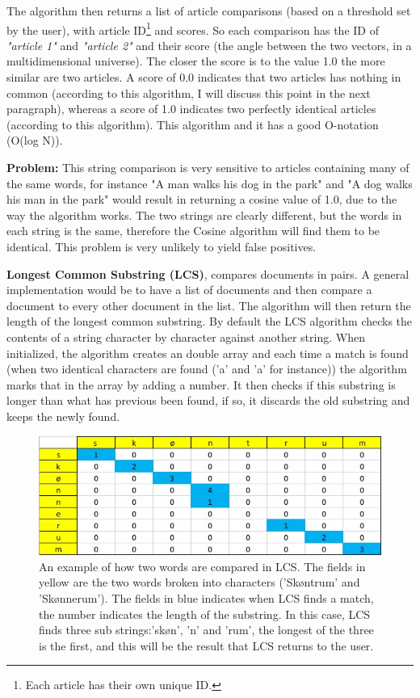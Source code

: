 The algorithm then returns a list of article comparisons (based on a threshold set by the user), with article ID\footnote{Each article has their own unique ID.} and scores. So each comparison has the ID of \textit{"article 1"} and \textit{"article 2"} and their score (the angle between the two vectors, in a multidimensional universe). The closer the score is to the value 1.0 the more similar are two articles. A score of 0.0 indicates that two articles has nothing in common (according to this algorithm, I will discuss this point in the next paragraph), whereas a score of 1.0 indicates two perfectly identical articles (according to this algorithm). This algorithm and it has a good O-notation (O(log N)).

\textbf{Problem:} \label{CosineProblem} This string comparison is very sensitive to articles containing many of the same words, for instance "A man walks his dog in the park" and "A dog walks his man in the park" would result in returning a cosine value of 1.0, due to the way the algorithm works. The two strings are clearly different, but the words in each string is the same, therefore the Cosine algorithm will find them to be identical. This problem is very unlikely to yield false positives.

\textbf{Longest Common Substring (LCS)}, compares documents in pairs. A general implementation would be to have a list of documents and then compare a document to every other document in the list. The algorithm will then return the length of the longest common substring. By default the LCS algorithm\cite{WikiLCS} checks the contents of a string character by character against another string. When initialized, the algorithm creates an double array and each time a match is found (when two identical characters are found ('a' and 'a' for instance)) the algorithm marks that in the array by adding a number. It then checks if this substring is longer than what has previous been found, if so, it discards the old substring and keeps the newly found.

\begin{figure}[h]
	\centering
	\includegraphics[scale=0.75]{figures/LcsExplained}
	\caption{An example of how two words are compared in LCS. The fields in yellow are the two words broken into characters ('Skøntrum' and 'Skønnerum'). The fields in blue indicates when LCS finds a match, the number indicates the length of the substring. In this case, LCS finds three sub strings:'skøn', 'n' and 'rum', the longest of the three is the first, and this will be the result that LCS returns to the user. }
	\label{LcsExplained}
\end{figure}

